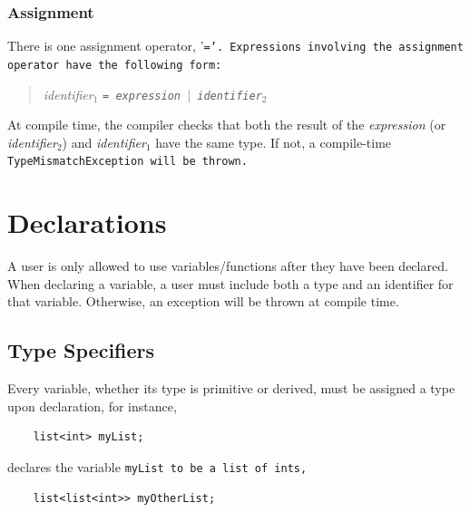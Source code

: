 \documentclass{book}
\begin{document}

\subsubsection{Assignment} %
\label{ssub:assignment}

There is one assignment operator, '\tt =\rm'. Expressions involving the
assignment operator have the following form:

\begin{quotation}
\emph{identifier}$_1$ \tt = \rm \emph{expression} $|$ \emph{identifier}$_2$
\end{quotation}

At compile time, the compiler checks that both the result of the \emph{expression}
(or \emph{identifier}$_2$) and \emph{identifier}$_1$ have the same type. If not, a
compile-time \tt TypeMismatchException \rm will be thrown.




\section{Declarations} %
\label{sec:declarations}

A user is only allowed to use variables/functions after they have been
declared. When declaring a variable, a user must include both a type and an
identifier for that variable. Otherwise, an exception will be thrown at compile
time.

\subsection{Type Specifiers} %
\label{sub:type_specifiers}

Every variable, whether its type is primitive or derived, must be assigned a
type upon declaration, for instance,

\begin{verbatim}
    list<int> myList;
\end{verbatim}

declares the variable \tt myList \rm to be a \tt list \rm of \tt int\rm s,

\begin{verbatim}
    list<list<int>> myOtherList;
\end{verbatim}
\end{document}
